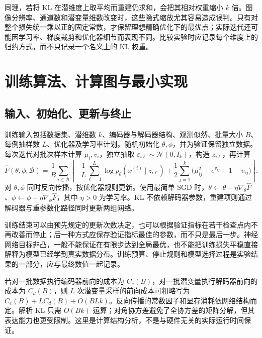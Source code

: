 \documentclass[UTF8,12pt,a4paper,fontset=fandol]{ctexart}
\begin{document}
同理，若将 KL 在潜维度上取平均而重建仍求和，会把其相对权重缩小 $k$ 倍。图像分辨率、通道数和潜变量维数改变时，这些隐式缩放尤其容易造成误判。只有对整个损失统一乘以正的固定常数，才保留理想精确优化下的最优点；实际迭代还可能因学习率、梯度裁剪和优化器细节而表现不同。比较实验时应记录每个维度上的归约方式，而不只记录一个名义上的 KL 权重。

\section{训练算法、计算图与最小实现}
\label{sec:vae-training}

\subsection{输入、初始化、更新与终止}
训练输入包括数据集、潜维数 $k$、编码器与解码器结构、观测似然、批量大小 $B$、每例抽样数 $L$、优化器及学习率计划。随机初始化 $\theta,\phi$，并为验证保留独立数据。每次迭代对批次样本计算 $\mu_i,v_i$，独立抽取 $\varepsilon_{i\ell}\sim\mathcal N(0,I_k)$，构造 $z_{i\ell}$，再计算
\begin{equation}
 \widehat F(\theta,\phi;\mathcal B)
 =\frac1B\sum_{i\in\mathcal B}\left[
 -\frac1L\sum_{\ell=1}^{L}\log p_\theta(x^{(i)}\mid z_{i\ell})
 +\frac12\sum_{j=1}^{k}
      \bigl(\mu_{ij}^{2}+e^{v_{ij}}-1-v_{ij}\bigr)\right].
 \label{eq:vae-minibatch-objective}
\end{equation}
对 $\theta,\phi$ 同时反向传播，按优化器规则更新。使用最简单 SGD 时，$\theta\leftarrow\theta-\eta\nabla_\theta\widehat F$、$\phi\leftarrow\phi-\eta\nabla_\phi\widehat F$，其中 $\eta>0$ 为学习率。KL 不依赖解码器参数，重建项则通过解码器与重参数化路径同时更新两组网络。

训练结束可以由预先规定的更新次数决定，也可以根据验证指标在若干检查点内不再改善而停止；后一种方式应保存验证指标最佳的参数，而不只是最后一步。神经网络目标非凸，一般不能保证在有限步达到全局最优，也不能把训练损失平稳直接解释为模型已经学到真实数据分布。训练预算、停止规则和模型选择过程是实验结果的一部分，应与最终数值一起记录。

若对一批数据执行编码器前向的成本为 $C_e(B)$，对一批潜变量执行解码器前向的成本为 $C_d(B)$，则 $L$ 次潜变量采样的前向成本可粗略写为 $C_e(B)+LC_d(B)+O(BLk)$。反向传播的常数因子和显存消耗依网络结构而定。解析 KL 只需 $O(Bk)$ 运算；对角协方差避免了全协方差的矩阵分解，但其表达能力也更受限制。这里是计算结构分析，不是与硬件无关的实际运行时间保证。
\end{document}
